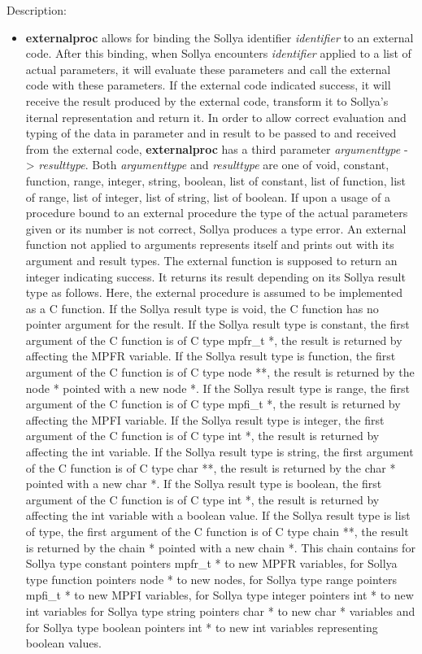 \noindent Description: \begin{itemize}

\item \textbf{externalproc} allows for binding the Sollya identifier
   \emph{identifier} to an external code.  After this binding, when Sollya
   encounters \emph{identifier} applied to a list of actual parameters, it
   will evaluate these parameters and call the external code with these
   parameters. If the external code indicated success, it will receive
   the result produced by the external code, transform it to Sollya's
   iternal representation and return it.
   In order to allow correct evaluation and typing of the data in
   parameter and in result to be passed to and received from the external
   code, \textbf{externalproc} has a third parameter \emph{argumenttype} -> \emph{resulttype}.
   Both \emph{argumenttype} and \emph{resulttype} are one of void, constant,
   function, range, integer, string, boolean, list of constant, list of
   function, list of range, list of integer, list of string, list of
   boolean.
   If upon a usage of a procedure bound to an external procedure the type
   of the actual parameters given or its number is not correct, Sollya
   produces a type error. An external function not applied to arguments
   represents itself and prints out with its argument and result types.
   The external function is supposed to return an integer indicating
   success.  It returns its result depending on its Sollya result type
   as follows. Here, the external procedure is assumed to be implemented
   as a C function.
   If the Sollya result type is void, the C function has no pointer
   argument for the result.  If the Sollya result type is constant, the
   first argument of the C function is of C type mpfr\_t *, the result is
   returned by affecting the MPFR variable.  If the Sollya result type
   is function, the first argument of the C function is of C type node
   **, the result is returned by the node * pointed with a new node *.
   If the Sollya result type is range, the first argument of the C
   function is of C type mpfi\_t *, the result is returned by affecting
   the MPFI variable.  If the Sollya result type is integer, the first
   argument of the C function is of C type int *, the result is returned
   by affecting the int variable.  If the Sollya result type is string,
   the first argument of the C function is of C type char **, the result
   is returned by the char * pointed with a new char *.  If the Sollya
   result type is boolean, the first argument of the C function is of C
   type int *, the result is returned by affecting the int variable with
   a boolean value.  If the Sollya result type is list of type, the
   first argument of the C function is of C type chain **, the result is
   returned by the chain * pointed with a new chain *.  This chain
   contains for Sollya type constant pointers mpfr\_t * to new MPFR
   variables, for Sollya type function pointers node * to new nodes, for
   Sollya type range pointers mpfi\_t * to new MPFI variables, for
   Sollya type integer pointers int * to new int variables for Sollya
   type string pointers char * to new char * variables and for Sollya
   type boolean pointers int * to new int variables representing boolean
   values.
   	       

\end{itemize}
